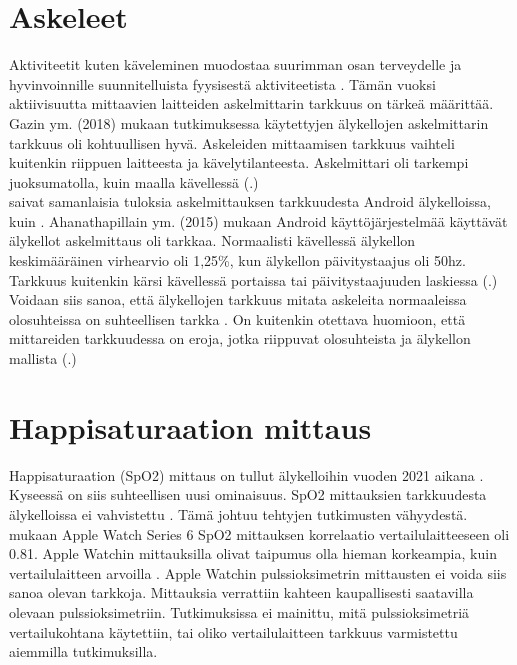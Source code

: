 \documentclass[utf8,bachelor,finnish]{bachelor}
\begin{document}
  \section{Askeleet}
  Aktiviteetit kuten käveleminen muodostaa suurimman osan terveydelle ja hyvinvoinnille suunnitelluista fyysisestä aktiviteetista \parencite{gaz_determining_2018}.
   Tämän vuoksi aktiivisuutta mittaavien laitteiden askelmittarin tarkkuus on tärkeä määrittää.
    Gazin ym. (2018) mukaan tutkimuksessa käytettyjen älykellojen askelmittarin tarkkuus oli kohtuullisen hyvä. Askeleiden mittaamisen tarkkuus
     vaihteli kuitenkin riippuen laitteesta ja kävelytilanteesta. Askelmittari oli tarkempi juoksumatolla, kuin
      maalla kävellessä (\cite{gaz_determining_2018}.)\\
  
  \textcite{ahanathapillai_preliminary_2015} saivat samanlaisia tuloksia askelmittauksen tarkkuudesta Android älykelloissa, kuin \textcite{gaz_determining_2018}.
   Ahanathapillain ym. (2015) mukaan Android käyttöjärjestelmää käyttävät älykellot askelmittaus oli tarkkaa.
    Normaalisti kävellessä älykellon keskimääräinen virhearvio oli 1,25\%, kun älykellon päivitystaajus oli 50hz.
     Tarkkuus kuitenkin kärsi kävellessä portaissa tai päivitystaajuuden laskiessa (\cite{ahanathapillai_preliminary_2015}.)\\
  
  Voidaan siis sanoa, että älykellojen tarkkuus mitata askeleita normaaleissa olosuhteissa on suhteellisen tarkka
   \parencite{gaz_determining_2018,ahanathapillai_preliminary_2015}. On kuitenkin otettava huomioon, että mittareiden
    tarkkuudessa on eroja, jotka riippuvat olosuhteista ja älykellon mallista (\cite{gaz_determining_2018}.)
  

  \section{Happisaturaation mittaus}
  Happisaturaation (SpO2) mittaus on tullut älykelloihin vuoden 2021 aikana \parencite{zhang_can_2022}. Kyseessä on siis suhteellisen uusi ominaisuus.
   SpO2 mittauksien tarkkuudesta älykelloissa ei vahvistettu \parencite{zhang_can_2022}. Tämä johtuu tehtyjen tutkimusten vähyydestä.\\
    
  \cite{pipek_comparison_2021} mukaan Apple Watch Series 6 SpO2 mittauksen korrelaatio vertailulaitteeseen oli 0.81.
   Apple Watchin mittauksilla olivat taipumus olla hieman korkeampia, kuin vertailulaitteen arvoilla \parencite{pipek_comparison_2021}.
    Apple Watchin pulssioksimetrin mittausten ei voida siis sanoa olevan tarkkoja.
    Mittauksia verrattiin kahteen kaupallisesti saatavilla olevaan pulssioksimetriin.
     Tutkimuksissa ei mainittu, mitä pulssioksimetriä vertailukohtana käytettiin, tai oliko vertailulaitteen tarkkuus varmistettu aiemmilla tutkimuksilla.
   
\end{document}
